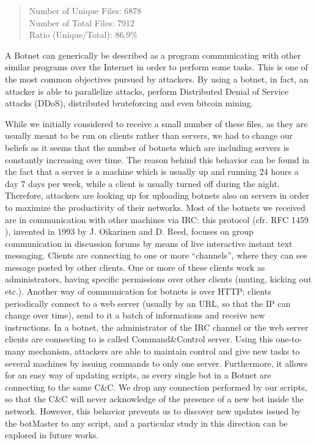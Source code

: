 \begin{quote}
Number of Unique Files: 6878\\
Number of Total Files: 7912\\
Ratio (Unique/Total): 86.9\%
\end{quote}

A Botnet can generically be described as a program communicating with other similar programs over the Internet in order to perform some tasks. This is one of the most common objectives pursued by attackers. By using a botnet, in fact, an attacker is able to parallelize attacks, perform Distributed Denial of Service attacks (DDoS), distributed bruteforcing and even bitcoin mining.

While we initially considered to receive a small number of these files, as they are usually meant to be run on clients rather than servers, we had to change our beliefs as it seems that the number of botnets which are including servers is constantly increasing over time. The reason behind this behavior can be found in the fact that a server is a machine which is usually up and running 24 hours a day 7 days per week, while a client is usually turned off during the night. Therefore, attackers are looking up for uploading botnets also on servers in order to maximize the productivity of their networks.
Most of the botnets we received are in communication with other machines via IRC: this protocol (cfr. RFC 1459 \cite{irc}), invented in 1993 by J. Oikarinen and D. Reed, focuses on group communication in discussion forums by means of live interactive instant text messaging. Clients are connecting to one or more ``channels'', where they can see message posted by other clients. One or more of these clients work as administrators, having specific permissions over other clients (muting, kicking out etc.).
Another way of communication for botnets is over HTTP: clients periodically connect to a web server (usually by an URL, so that the IP can change over time), send to it a batch of informations and receive new instructions.
In a botnet, the administrator of the IRC channel or the web server clients are connecting to is called Command\&Control server. Using this one-to-many mechanism, attackers are able to maintain control and give new tasks to several machines by issuing commands to only one server. Furthermore, it allows for an easy way of updating scripts, as every single bot in a Botnet are connecting to the same C\&C. We drop any connection performed by our scripts, so that the C\&C will never acknowledge of the presence of a new bot inside the network. However, this behavior prevents us to discover new updates issued by the botMaster to any script, and a particular study in this direction can be explored in future works.


